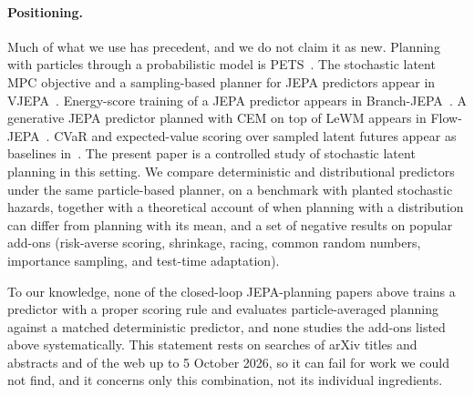 \paragraph{Positioning.}
Much of what we use has precedent, and we do not claim it as new. Planning with particles through a probabilistic model is PETS~\cite{chua2018pets}. The stochastic latent MPC objective and a sampling-based planner for JEPA predictors appear in VJEPA~\cite{huang2026vjepa}. Energy-score training of a JEPA predictor appears in Branch-JEPA~\cite{song2026branchjepa}. A generative JEPA predictor planned with CEM on top of LeWM appears in Flow-JEPA~\cite{huo2026flowjepa}. CVaR and expected-value scoring over sampled latent futures appear as baselines in~\cite{liu2026djepa}. The present paper is a controlled study of stochastic latent planning in this setting. We compare deterministic and distributional predictors under the same particle-based planner, on a benchmark with planted stochastic hazards, together with a theoretical account of when planning with a distribution can differ from planning with its mean, and a set of negative results on popular add-ons (risk-averse scoring, shrinkage, racing, common random numbers, importance sampling, and test-time adaptation).

To our knowledge, none of the closed-loop JEPA-planning papers above trains a predictor with a proper scoring rule and evaluates particle-averaged planning against a matched deterministic predictor, and none studies the add-ons listed above systematically. This statement rests on searches of arXiv titles and abstracts and of the web up to 5 October 2026, so it can fail for work we could not find, and it concerns only this combination, not its individual ingredients.
